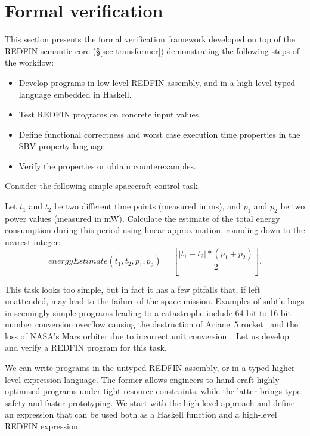 \section{Formal verification\label{sec-verification}}
This section presents the formal verification framework developed on top of
the REDFIN semantic core (\S\ref{sec-transformer}) demonstrating the following
steps of the workflow:

\begin{itemize}
    \item Develop programs in low-level REDFIN assembly, and in a high-level
    typed language embedded in Haskell.
    \item Test REDFIN programs on concrete input values.
    \item Define functional correctness and worst case execution time properties
    in the SBV property language.
    \item Verify the properties or obtain counterexamples.
\end{itemize}

\noindent
Consider the following simple spacecraft control task.

\begin{tcolorbox}
Let $t_1$ and $t_2$ be two different time points (measured in ms),
and $p_1$ and $p_2$ be two power values (measured in mW).
Calculate the estimate of the total energy consumption during this period
using linear approximation, rounding down to the nearest integer:
\[
\textit{energyEstimate}(t_1, t_2, p_1, p_2) = \left\lfloor \frac{|t_1 - t_2| * (p_1 + p_2)}{2} \right\rfloor.
\]
\end{tcolorbox}

\noindent
This task looks too simple, but in fact it has a few pitfalls that,
if left unattended, may lead to the failure of the space mission. Examples
of subtle bugs in seemingly simple programs leading to a catastrophe include 64-bit
to 16-bit number conversion overflow causing the destruction of Ariane~5
rocket~\cite{bug-rocket} and the loss of NASA's Mars orbiter due to incorrect
unit conversion~\cite{NASA:1999:Mars}. Let us develop and verify
a REDFIN program for this task.

We can write programs in the untyped REDFIN assembly, or in a typed higher-level
expression language. The former allows engineers to hand-craft highly optimised
programs under tight resource constraints, while the latter brings type-safety
and faster prototyping. We start with the high-level approach and define an
expression that can be used both as a Haskell function and a high-level REDFIN
expression:

